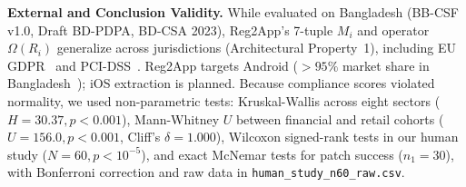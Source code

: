\noindent\textbf{External and Conclusion Validity.} While evaluated on Bangladesh (BB-CSF v1.0, Draft BD-PDPA, BD-CSA 2023), Reg2App's 7-tuple $M_i$ and operator $\Omega(R_i)$ generalize across jurisdictions (Architectural Property~1), including EU GDPR~\cite{gdpr_2016} and PCI-DSS~\cite{pci_dss_v4}. Reg2App targets Android ($>95\%$ market share in Bangladesh~\cite{statcounter_os_2026}); iOS extraction is planned. Because compliance scores violated normality, we used non-parametric tests: Kruskal-Wallis across eight sectors ($H = 30.37, p < 0.001$), Mann-Whitney $U$ between financial and retail cohorts ($U = 156.0, p < 0.001$, Cliff's $\delta = 1.000$), Wilcoxon signed-rank tests in our human study ($N=60, p < 10^{-5}$), and exact McNemar tests for patch success ($n_1=30$), with Bonferroni correction and raw data in \texttt{human\_study\_n60\_raw.csv}.
